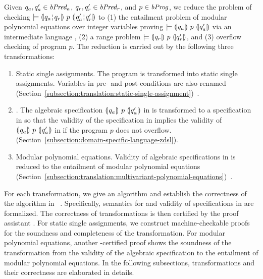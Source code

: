 
Given $q_a, q_a' \in \mathit{bPred_a}$, $q_r, q_r' \in \mathit{bPred_r}$, and $p \in \mathit{bProg}$, we reduce the problem of checking $\models \hoaretriple{q_a \andar q_r}{p}{q_a' \andar q_r'}$ to (1) the entailment problem of modular
polynomial equations over integer variables proving $\models {(\!|}{q_a}{|\!)}~{p}~{(\!|}{q_a'}{|\!)}$ via an intermediate language \zdsl, (2) a range problem $\models {(\!|}{q_r}{|\!)}~{p}~{(\!|}{q_r'}{|\!)}$, and (3) overflow checking of program $p$.
The reduction is carried out by the following three transformations:
\begin{enumerate}
\item Static single assignments. The program is transformed
  into static single assignments. Variables in pre- and
  post-conditions are also renamed
  (Section~\ref{subsection:translation:static-single-assignment})~\cite{AWZ:88:DQVP}.
\item \zdsl. The algebraic specification ${(\!|}{q_a}{|\!)}~{p}~{(\!|}{q_a'}{|\!)}$ in \bvdsl is transformed to a specification in \zdsl so that the validity of the specification in \zdsl implies the validity of ${(\!|}{q_a}{|\!)}~{p}~{(\!|}{q_a'}{|\!)}$ in \bvdsl if the program $p$ does not overflow. (Section~\ref{subsection:domain-specific-language-zdsl}).
\item Modular polynomial equations. Validity of algebraic specifications in \zdsl
  is reduced to the entailment of modular polynomial equations
  (Section~\ref{subsection:translation:multivariant-polynomial-equations})~\cite{H:07:AENTP}.
\end{enumerate}

For each transformation, we give an algorithm and establish the
correctness of the algorithm in \coq~\cite{YC:2004:ITPPDC}.
Specifically, semantics for \zdsl and validity of specifications in \zdsl are formalized.
The correctness of transformations is then certified by the proof assistant \coq.
For static single assignments, we
construct machine-checkable proofs for the soundness and completeness
of the transformation. For modular polynomial equations, another
\coq-certified proof shows the soundness of the transformation
from the validity of the algebraic specification to the entailment of
modular polynomial equations. In the following subsections,
transformations and their correctness are elaborated in details.